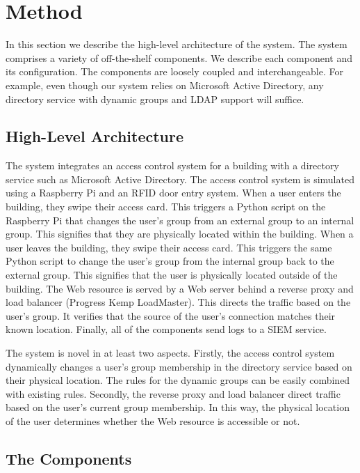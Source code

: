 \section{Method}\label{sec:method}

In this section we describe the high-level architecture of the system.
The system comprises a variety of off-the-shelf components.  We
describe each component and its configuration.  The components are
loosely coupled and interchangeable.  For example, even though our
system relies on Microsoft Active Directory, any directory service
with dynamic groups and LDAP support will suffice.

\subsection{High-Level Architecture}

The system integrates an access control system for a building with a
directory service such as Microsoft Active Directory.  The access
control system is simulated using a Raspberry Pi and an RFID door
entry system.  When a user enters the building, they swipe their
access card.  This triggers a Python script on the Raspberry Pi that
changes the user's group from an external group to an internal group.
This signifies that they are physically located within the building.
When a user leaves the building, they swipe their access card.  This
triggers the same Python script to change the user's group from the
internal group back to the external group.  This signifies that the
user is physically located outside of the building.  The Web resource
is served by a Web server behind a reverse proxy and load balancer
(Progress Kemp LoadMaster).  This directs the traffic based on the
user's group.  It verifies that the source of the user's connection
matches their known location.  Finally, all of the components send
logs to a SIEM service.

The system is novel in at least two aspects.  Firstly, the access
control system dynamically changes a user's group membership in the
directory service based on their physical location.  The rules for the
dynamic groups can be easily combined with existing rules.  Secondly,
the reverse proxy and load balancer direct traffic based on the user's
current group membership.  In this way, the physical location of the
user determines whether the Web resource is accessible or not.

\subsection{The Components}

